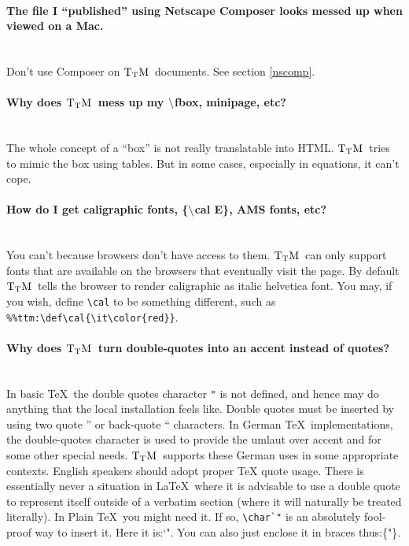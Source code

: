 \documentclass[12pt]{article}
\def\TtM{$\rm{}T_TH$}
\def\TtM{$\rm{}T_TM$}%
\begin{document}
\paragraph{The file I ``published'' using Netscape Composer looks
messed up when viewed on a Mac.}\leavevmode\\
Don't use Composer on \TtM\ documents. See section \ref{nscomp}.

\paragraph{Why does \TtM\ mess up my $\tt\backslash$fbox,
minipage, etc?}\leavevmode\\ The whole concept of a ``box'' is not really
translatable into HTML. \TtM\ tries to mimic the box using tables. But
in some cases, especially in equations, it can't cope.

\paragraph{How do I get caligraphic fonts, \{$\tt\backslash$cal E\}, AMS
fonts,  etc?}\leavevmode\\
You can't because browsers don't have access to them. \TtM\ can only
support fonts that are available on the browsers that eventually visit
the page. By default \TtM\ tells the browser to render caligraphic as
italic helvetica font. You may, if you wish, define \verb|\cal| to be
something different, such as \verb|%%ttm:\def\cal{\it\color{red}}|.

\paragraph{Why does \TtM\ turn double-quotes into an accent
instead of quotes?}\leavevmode\\ In basic \TeX\ the double quotes character
\verb+"+ is not defined, and hence may do anything that the local
installation feels like. Double quotes must be inserted by using two
quote '' or back-quote `` characters.  In German \TeX\ implementations,
the double-quotes character is used to provide the umlaut over accent
and for some other special needs. \TtM\ supports these German uses in
some appropriate contexts. English speakers should adopt proper \TeX
quote usage.  There is essentially never a situation in \LaTeX\ where
it is advisable to use a double quote to represent itself outside of a
verbatim section (where it will naturally be treated literally). In
Plain \TeX\ you might need it. If so, \verb!\char`"! is an
absolutely fool-proof way to insert it. Here it is:\char`". 
You can also just enclose it in braces thus:\{{"}\}. 
\end{document}
